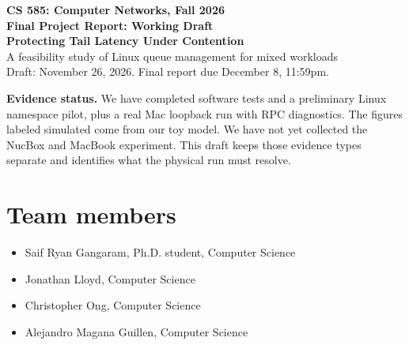 \documentclass[11pt]{article}
\begin{document}
\begin{center}
{\Large\textbf{CS 585: Computer Networks, Fall 2026}}\\[4pt]
{\Large\textbf{Final Project Report: Working Draft}}\\[8pt]
{\LARGE\color{cherry}\textbf{Protecting Tail Latency Under Contention}}\\[5pt]
A feasibility study of Linux queue management for mixed workloads\\[8pt]
Draft: November 26, 2026. Final report due December 8, 11:59pm.
\end{center}

\textbf{Evidence status.} We have completed software tests and a preliminary
Linux namespace pilot, plus a real Mac loopback run with RPC diagnostics.
The figures labeled simulated come from our toy model.
We have not yet collected the NucBox and MacBook experiment. This draft keeps
those evidence types separate and identifies what the physical run must resolve.

\section*{Team members}
\begin{itemize}
\item Saif Ryan Gangaram, Ph.D. student, Computer Science
\item Jonathan Lloyd, Computer Science
\item Christopher Ong, Computer Science
\item Alejandro Magana Guillen, Computer Science
\end{itemize}










\end{document}
